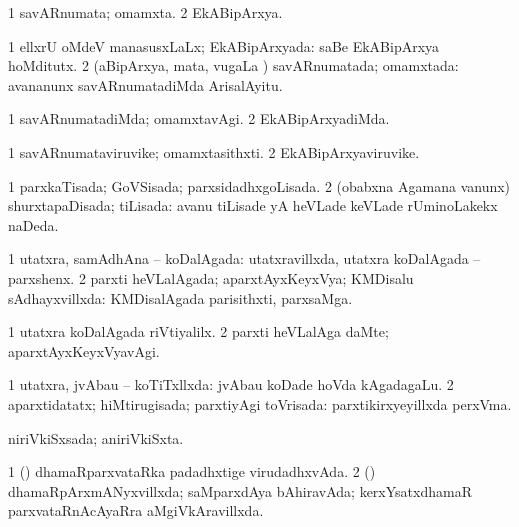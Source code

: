 {\bentry
{} 
\gl{\nA}
\expl{}
\bmng
\bnum
\num{1} savARnumata; omamxta. 
\num{2} EkABipArxya. 
\enum
\emng
\eentry

\bentry
{} 
\gl{\gu}
\expl{}
\bmng
\bnum
\num{1} ellxrU oMdeV manasusxLaLx; EkABipArxyada:  saBe EkABipArxya hoMditutx. 
\num{2} (aBipArxya, mata, \mo vugaLa \vi) savARnumatada; omamxtada:  avananunx savARnumatadiMda ArisalAyitu. 
\enum
\emng
\eentry

\bentry
{} 
\gl{\kirxvi}
\expl{}
\bmng
\bnum
\num{1} savARnumatadiMda; omamxtavAgi. 
\num{2} EkABipArxyadiMda. 
\enum
\emng
\eentry

\bentry
{} 
\gl{\nA}
\expl{}
\bmng
\bnum
\num{1} savARnumataviruvike; omamxtasithxti. 
\num{2} EkABipArxyaviruvike. 
\enum
\emng
\eentry

\bentry
{} 
\gl{\gu}
\expl{}
\bmng
\bnum
\num{1} parxkaTisada; GoVSisada; parxsidadhxgoLisada. 
\num{2} (obabxna Agamana \mo vanunx) shurxtapaDisada; tiLisada:  avanu tiLisade yA heVLade keVLade rUminoLakekx naDeda. 
\enum
\emng
\eentry

\bentry
{} 
\gl{\gu}
\expl{}
\bmng
\bnum
\num{1} utatxra, samAdhAna -- koDalAgada:  utatxravillxda, utatxra koDalAgada -- parxshenx. 
\num{2} parxti heVLalAgada; aparxtAyxKeyxVya; KMDisalu sAdhayxvillxda:  KMDisalAgada parisithxti, parxsaMga. 
\enum
\emng
\eentry

\bentry
{} 
\gl{\kirxvi}
\expl{}
\bmng
\bnum
\num{1} utatxra koDalAgada riVtiyalilx. 
\num{2} parxti heVLalAga daMte; aparxtAyxKeyxVyavAgi. 
\enum
\emng
\eentry

\bentry
{} 
\gl{\gu}
\expl{}
\bmng
\bnum
\num{1} utatxra, jvAbau -- koTiTxllxda:  jvAbau koDade hoVda kAgadagaLu. 
\num{2} aparxtidatatx; hiMtirugisada; parxtiyAgi toVrisada:  parxtikirxyeyillxda perxVma. 
\enum
\emng
\eentry

\bentry
{} 
\gl{\gu}
\expl{}
\bmng
niriVkiSxsada; aniriVkiSxta. 
\emng
\eentry

\bentry
{} 
\gl{\gu}
\expl{}
\bmng
\bnum
\num{1} (\kerxY) dhamaRparxvataRka padadhxtige virudadhxvAda. 
\num{2} (\kerxY) dhamaRpArxmANyxvillxda; saMparxdAya bAhiravAda; kerxYsatxdhamaR parxvataRnAcAyaRra aMgiVkAravillxda. 
\enum
\emng
\eentry

}
